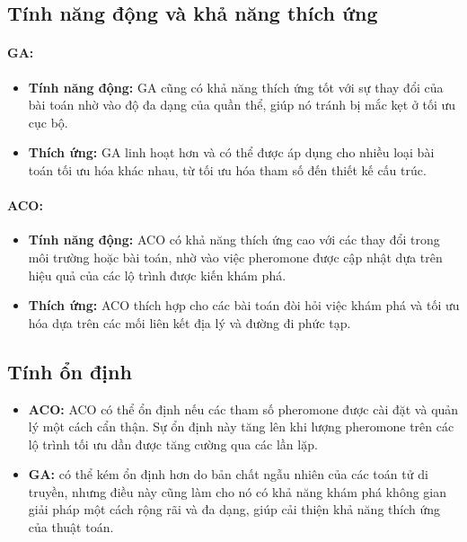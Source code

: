 \documentclass[14pt]{article}
\begin{document}
	\subsection{Tính năng động và khả năng thích ứng}
	
	\paragraph{GA:}
	\begin{itemize}
		\item \textbf{Tính năng động:} GA cũng có khả năng thích ứng tốt với sự thay đổi của bài toán nhờ vào độ đa dạng của quần thể, giúp nó tránh bị mắc kẹt ở tối ưu cục bộ.
		\item \textbf{Thích ứng:} GA linh hoạt hơn và có thể được áp dụng cho nhiều loại bài toán tối ưu hóa khác nhau, từ tối ưu hóa tham số đến thiết kế cấu trúc.
	\end{itemize}

	\paragraph{ACO:}
	\begin{itemize}
		\item \textbf{Tính năng động:} ACO có khả năng thích ứng cao với các thay đổi trong môi trường hoặc bài toán, nhờ vào việc pheromone được cập nhật dựa trên hiệu quả của các lộ trình được kiến khám phá.
		\item \textbf{Thích ứng:} ACO thích hợp cho các bài toán đòi hỏi việc khám phá và tối ưu hóa dựa trên các mối liên kết địa lý và đường đi phức tạp.
	\end{itemize}
	

	
	\subsection{Tính ổn định}
	\begin{itemize}
		\item \textbf{ACO:} ACO có thể ổn định nếu các tham số pheromone được cài đặt và quản lý một cách cẩn thận. Sự ổn định này tăng lên khi lượng pheromone trên các lộ trình tối ưu dần được tăng cường qua các lần lặp.
	\end{itemize}
	
	
	\begin{itemize}
		\item \textbf{GA:} có thể kém ổn định hơn do bản chất ngẫu nhiên của các toán tử di truyền, nhưng điều này cũng làm cho nó có khả năng khám phá không gian giải pháp một cách rộng rãi và đa dạng, giúp cải thiện khả năng thích ứng của thuật toán.
	\end{itemize}
	\newpage
\end{document}
